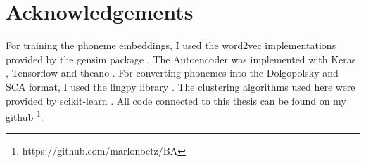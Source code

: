 \documentclass[6pt]{article}
\begin{document}
\section{Acknowledgements}
For training the phoneme embeddings, I used the word2vec implementations provided by the gensim package \citep{rehurek_lrec}. The Autoencoder was implemented with Keras \citep{chollet2015keras}, Tensorflow \citep{tensorflow2015-whitepaper} and theano \citep{2016arXiv160502688short}. For converting phonemes into the Dolgopolsky and SCA format, I used the lingpy library \citep{List2016e}. The clustering algorithms used here were provided by scikit-learn \citep{scikit-learn}. All code connected to this thesis can be found on my github \footnote{https://github.com/marlonbetz/BA}.




\end{document}
